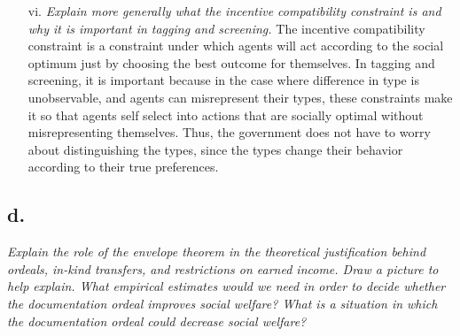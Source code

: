 \documentclass[
]{article}
\begin{document}
\begin{enumerate}
\item[vi.] \textit{Explain more generally what the incentive compatibility constraint is and why it is important in tagging and screening.}
\newline
\newline
The incentive compatibility constraint is a constraint under which agents will act according to the social optimum just by choosing the best outcome for themselves. In tagging and screening, it is important because in the case where difference in type is unobservable, and agents can misrepresent their types, these constraints make it so that agents self select into actions that are socially optimal without misrepresenting themselves. Thus, the government does not have to worry about distinguishing the types, since the types change their behavior according to their true preferences. 
\end{enumerate}

\hypertarget{d.-1}{%
\subsection{d.~}\label{d.-1}}

\textit{Explain the role of the envelope theorem in the theoretical justification behind ordeals, in-kind transfers, and restrictions on earned income. Draw a picture to help explain. What empirical estimates would we need in order to decide whether the documentation ordeal improves social welfare? What is a situation in which the documentation ordeal could decrease social welfare?}
\end{document}
